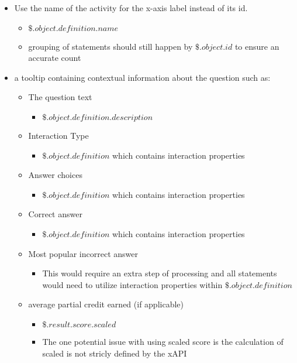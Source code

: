 \documentclass{article}
\begin{document}
\begin{itemize}
\item Use the name of the activity for the x-axis label instead of
  its id.
  \begin{itemize}
  \item $\$.object.definition.name$
  \item grouping of statements should still happen by
    $\$.object.id$ to ensure an accurate count
  \end{itemize}
\item a tooltip containing contextual information about the question
  such as:
  \begin{itemize}
  \item The question text
    \begin{itemize}
    \item $\$.object.definition.description$
    \end{itemize}
  \item Interaction Type
    \begin{itemize}
      \item $\$.object.definition$ which contains interaction properties
    \end{itemize}
  \item Answer choices
    \begin{itemize}
      \item $\$.object.definition$ which contains interaction properties
    \end{itemize}
  \item Correct answer
    \begin{itemize}
      \item $\$.object.definition$ which contains interaction properties
    \end{itemize}
  \item Most popular incorrect answer
    \begin{itemize}
      \item This would require an extra step of processing and all
        statements would need to utilize interaction properties within
        $\$.object.definition$
    \end{itemize}
  \item average partial credit earned (if applicable)
    \begin{itemize}
    \item $\$.result.score.scaled$
    \item The one potential issue with using scaled score is the
      calculation of scaled is not stricly defined by the xAPI

\end{itemize}
\end{itemize}
\end{itemize}
\end{document}
